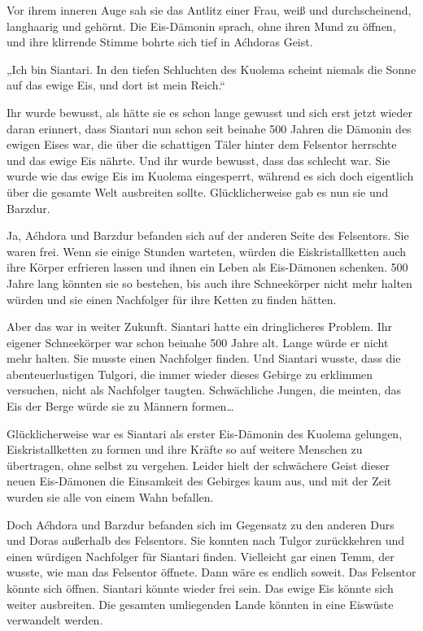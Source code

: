 Vor ihrem inneren Auge sah sie das Antlitz einer Frau, weiß und durchscheinend, langhaarig und gehörnt. Die Eis-Dämonin sprach, ohne ihren Mund zu öffnen, und ihre klirrende Stimme bohrte sich tief in Aćhdoras Geist.

„Ich bin Siantari. In den tiefen Schluchten des Kuolema scheint niemals die Sonne auf das ewige Eis, und dort ist mein Reich.“

Ihr wurde bewusst, als hätte sie es schon lange gewusst und sich erst jetzt wieder daran erinnert, dass Siantari nun schon seit beinahe 500 Jahren die Dämonin des ewigen Eises war, die über die schattigen Täler hinter dem Felsentor herrschte und das ewige Eis nährte. Und ihr wurde bewusst, dass das schlecht war. Sie wurde wie das ewige Eis im Kuolema eingesperrt, während es sich doch eigentlich über die gesamte Welt ausbreiten sollte. Glücklicherweise gab es nun sie und Barzdur.

Ja, Aćhdora und Barzdur befanden sich auf der anderen Seite des Felsentors. Sie waren frei. Wenn sie einige Stunden warteten, würden die Eiskristallketten auch ihre Körper erfrieren lassen und ihnen ein Leben als Eis-Dämonen schenken. 500 Jahre lang könnten sie so bestehen, bis auch ihre Schneekörper nicht mehr halten würden und sie einen Nachfolger für ihre Ketten zu finden hätten.

Aber das war in weiter Zukunft. Siantari hatte ein dringlicheres Problem. Ihr eigener Schneekörper war schon beinahe 500 Jahre alt. Lange würde er nicht mehr halten. Sie musste einen Nachfolger finden. Und Siantari wusste, dass die abenteuerlustigen Tulgori, die immer wieder dieses Gebirge zu erklimmen versuchen, nicht als Nachfolger taugten. Schwächliche Jungen, die meinten, das Eis der Berge würde sie zu Männern formen…

Glücklicherweise war es Siantari als erster Eis-Dämonin des Kuolema gelungen, Eiskristallketten zu formen und ihre Kräfte so auf weitere Menschen zu übertragen, ohne selbst zu vergehen. Leider hielt der schwächere Geist dieser neuen Eis-Dämonen die Einsamkeit des Gebirges kaum aus, und mit der Zeit wurden sie alle von einem Wahn befallen.

Doch Aćhdora und Barzdur befanden sich im Gegensatz zu den anderen Durs und Doras außerhalb des Felsentors. Sie konnten nach Tulgor zurückkehren und einen würdigen Nachfolger für Siantari finden. Vielleicht gar einen Temm, der wusste, wie man das Felsentor öffnete. Dann wäre es endlich soweit. Das Felsentor könnte sich öffnen. Siantari könnte wieder frei sein. Das ewige Eis könnte sich weiter ausbreiten. Die gesamten umliegenden Lande könnten in eine Eiswüste verwandelt werden.

